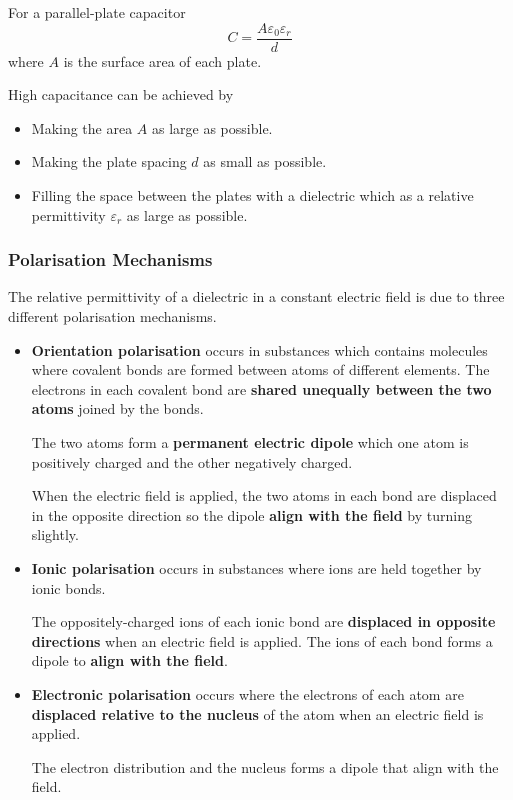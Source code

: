 For a parallel-plate capacitor
$$C=\frac{A\varepsilon_0\varepsilon_r}{d}$$
where $A$ is the surface area of each plate.

High capacitance can be achieved by
\begin{itemize}
    \item Making the area $A$ as large as possible.
    \item Making the plate spacing $d$ as small as possible.
    \item Filling the space between the plates with a dielectric which as a relative permittivity $\varepsilon_r$ as large as possible.
\end{itemize}

\subsubsection*{Polarisation Mechanisms}
The relative permittivity of a dielectric in a constant electric field is due to three different polarisation mechanisms.
\begin{itemize}
    \item \textbf{Orientation polarisation} occurs in substances which contains molecules where covalent bonds are formed between atoms of different elements. The electrons in each covalent bond are \textbf{shared unequally between the two atoms} joined by the bonds.

        The two atoms form a \textbf{permanent electric dipole} which one atom is positively charged and the other negatively charged.
        
        When the electric field is applied, the two atoms in each bond are displaced in the opposite direction so the dipole \textbf{align with the field} by turning slightly.
    \item \textbf{Ionic polarisation} occurs in substances where ions are held together by ionic bonds.

        The oppositely-charged ions of each ionic bond are \textbf{displaced in opposite directions} when an electric field is applied. The ions of each bond forms a dipole to \textbf{align with the field}.
    \item \textbf{Electronic polarisation} occurs where the electrons of each atom are \textbf{displaced relative to the nucleus} of the atom when an electric field is applied.

        The electron distribution and the nucleus forms a dipole that align with the field.
\end{itemize}

